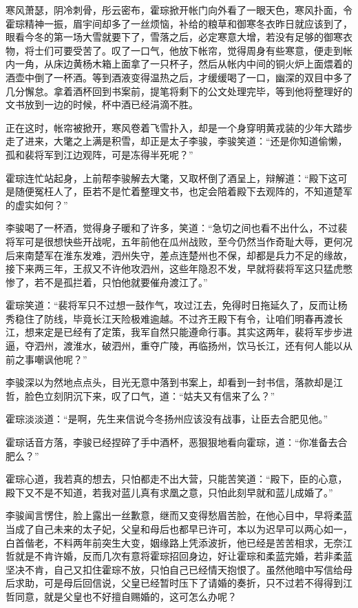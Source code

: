 寒风萧瑟，阴冷刺骨，彤云密布，霍琮掀开帐门向外看了一眼天色，寒风扑面，令霍琮精神一振，眉宇间却多了一丝烦恼，补给的粮草和御寒冬衣昨日就应该到了，眼看今冬的第一场大雪就要下了，雪落之后，必定寒意大增，若没有足够的御寒衣物，将士们可要受苦了。叹了一口气，他放下帐帘，觉得周身有些寒意，便走到帐内一角，从床边黄杨木箱上面拿了一只杯子，然后从帐内中间的铜火炉上面煨着的酒壶中倒了一杯酒。等到酒液变得温热之后，才缓缓喝了一口，幽深的双目中多了几分懈怠。拿着酒杯回到书案前，提笔将剩下的公文处理完毕，等到他将整理好的文书放到一边的时候，杯中酒已经涓滴不胜。

正在这时，帐帘被掀开，寒风卷着飞雪扑入，却是一个身穿明黄戎装的少年大踏步走了进来，大氅之上满是积雪，却正是太子李骏，李骏笑道：“还是你知道偷懒，孤和裴将军到江边观阵，可是冻得半死呢？”

霍琮连忙站起身，上前帮李骏解去大氅，又取杯倒了酒呈上，辩解道：“殿下这可是随便冤枉人了，臣若不是忙着整理文书，也定会陪着殿下去观阵的，不知道楚军的虚实如何？”

李骏喝了一杯酒，觉得身子暖和了许多，笑道：“急切之间也看不出什么，不过裴将军可是很想快些开战呢，五年前他在瓜州战败，至今仍然当作奇耻大辱，更何况后来南楚军在淮东发难，泗州失守，差点连楚州也不保，却都是兵力不足的缘故，接下来两三年，王叔又不许他攻泗州，这些年隐忍不发，早就将裴将军这只猛虎憋惨了，若不是孤拦着，只怕他就要催舟渡江了。”

霍琮笑道：“裴将军只不过想一鼓作气，攻过江去，免得时日拖延久了，反而让杨秀稳住了防线，毕竟长江天险极难逾越。不过齐王殿下有令，让咱们明春再渡长江，想来定是已经有了定策，我军自然只能遵命行事。其实这两年，裴将军步步进逼，夺泗州，渡淮水，破泗州，重夺广陵，再临扬州，饮马长江，还有何人能以从前之事嘲讽他呢？”

李骏深以为然地点点头，目光无意中落到书案上，却看到一封书信，落款却是江哲，脸色立刻阴沉下来，叹了口气，道：“姑夫又有信来了么？”

霍琮淡淡道：“是啊，先生来信说今冬扬州应该没有战事，让臣去合肥见他。”

霍琮话音方落，李骏已经捏碎了手中酒杯，恶狠狠地看向霍琮，道：“你准备去合肥么？”

霍琮心道，我若真的想去，只怕都走不出大营，只能苦笑道：“殿下，臣的心意，殿下又不是不知道，若我对蓝儿真有求凰之意，只怕此刻早就和蓝儿成婚了。”

李骏闻言愣住，脸上露出一丝歉意，继而又变得愁眉苦脸，在他心目中，早将柔蓝当成了自己未来的太子妃，父皇和母后也都早已许可，本以为迟早可以两心如一，白首偕老，不料两年前突生大变，姻缘路上凭添波折，他已经是苦苦相求，无奈江哲就是不肯许婚，反而几次有意将霍琮招回身边，好让霍琮和柔蓝完婚，若非柔蓝坚决不肯，自己又扣住霍琮不放，只怕自己已经情天抱恨了。虽然他暗中写信给母后求助，可是母后回信说，父皇已经暂时压下了请婚的奏折，只不过若不得得到江哲同意，就是父皇也不好擅自赐婚的，这可怎么办呢？

